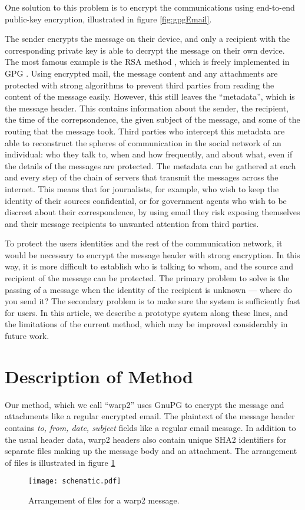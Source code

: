 \pdfoutput=1 \documentclass{article}
\begin{document}
One solution to this problem is to encrypt the communications using end-to-end public-key encryption, illustrated in figure \ref{fig:gpgEmail}.  

The sender encrypts the message on their device, and only a recipient with the corresponding private key is able to decrypt the message on their own device.  The most famous example is the RSA method \cite{RSA_ENCRYPTION}, which is freely implemented in GPG \cite{GNUPG}.  Using encrypted mail, the message content and any attachments are protected with strong algorithms to prevent third parties from reading the content of the message easily.  However, this still leaves the ``metadata'', which is the message header.  This contains information about the sender, the recipient, the time of the correpsondence, the given subject of the message, and some of the routing that the message took.  Third parties who intercept this metadata are able to reconstruct the spheres of communication in the social network of an individual: who they talk to, when and how frequently, and about what, even if the details of the messages are protected.  The metadata can be gathered at each and every step of the chain of servers that transmit the messages across the internet.  This means that for journalists, for example, who wish to keep the identity of their sources confidential, or for government agents who wish to be discreet about their correspondence, by using email they risk exposing themselves and their message recipients to unwanted attention from third parties.

To protect the users identities and the rest of the communication network, it would be necessary to encrypt the message header with strong encryption.  In this way, it is more difficult to establish who is talking to whom, and the source and recipient of the message can be protected.  The primary problem to solve is the passing of a message when the identity of the recipient is unknown --- where do you send it?  The secondary problem is to make sure the system is sufficiently fast for users.  In this article, we describe a prototype system along these lines, and the limitations of the current method, which may be improved considerably in future work.



\section{Description of Method}
Our method, which we call ``warp2'' uses GnuPG to encrypt the message and attachments like a regular encrypted email.  The plaintext of the message header contains \emph{to, from, date, subject} fields like a regular email message.  In addition to the usual header data, warp2 headers also contain unique SHA2 identifiers for separate files making up the message body and an attachment.  The arrangement of files is illustrated in figure \ref{fig:schematic}
\begin{figure}
\centering
\texttt{[image: schematic.pdf]}
\caption{Arrangement of files for a warp2 message.}
\label{fig:schematic}
\end{figure}
\end{document}
